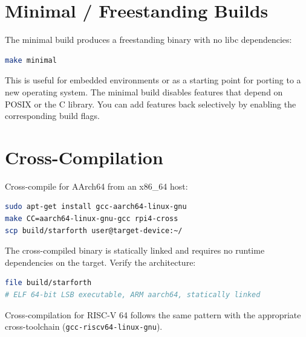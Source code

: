 \section{Minimal / Freestanding Builds}
\label{sec:minimal-build}

The minimal build produces a freestanding binary with no libc dependencies:

\begin{lstlisting}[language=bash]
make minimal
\end{lstlisting}

This is useful for embedded environments or as a starting point for porting to
a new operating system. The minimal build disables features that depend on POSIX
or the C library. You can add features back selectively by enabling the
corresponding build flags.

\section{Cross-Compilation}
\label{sec:cross-compile}

Cross-compile for AArch64 from an x86\_64 host:

\begin{lstlisting}[language=bash]
sudo apt-get install gcc-aarch64-linux-gnu
make CC=aarch64-linux-gnu-gcc rpi4-cross
scp build/starforth user@target-device:~/
\end{lstlisting}

The cross-compiled binary is statically linked and requires no runtime
dependencies on the target. Verify the architecture:

\begin{lstlisting}[language=bash]
file build/starforth
# ELF 64-bit LSB executable, ARM aarch64, statically linked
\end{lstlisting}

Cross-compilation for RISC-V 64 follows the same pattern with the appropriate
cross-toolchain (\texttt{gcc-riscv64-linux-gnu}).

